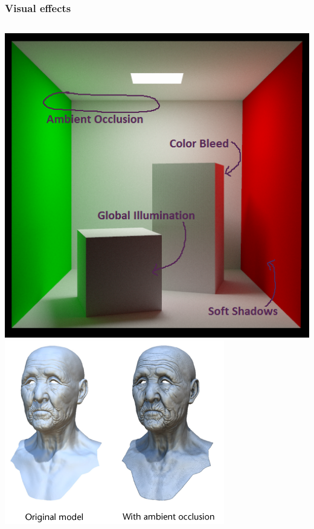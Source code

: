 \documentclass[aspectratio=169]{beamer}
\begin{document}
	\begin{frame}
		\frametitle{Visual effects}
		\begin{columns}
				\includegraphics[height=.7\textheight]{img/visual_effects.png}
				\includegraphics[height=.5\textheight]{img/ambient_occlusion.png}
		\end{columns}
	\end{frame}
\end{document}
